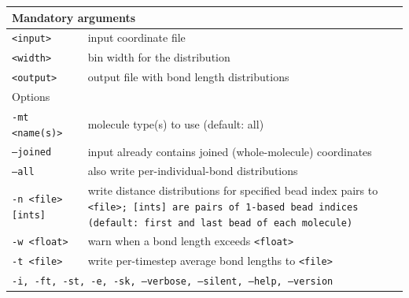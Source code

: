 \noindent
\begin{longtable}{p{}p{}}
  \toprule
  \multicolumn{2}{l}{Mandatory arguments} \\
  \midrule
  \tt{<input>}  & input coordinate file \\
  \tt{<width>}  & bin width for the distribution \\
  \tt{<output>} & output file with bond length distributions \\
  \toprule
  \multicolumn{2}{l}{Options} \\
  \midrule
  \tt{-mt <name(s)>}    & molecule type(s) to use (default: all) \\
  \tt{--joined}         & input already contains joined (whole-molecule)
                          coordinates \\
  \tt{--all}            & also write per-individual-bond distributions \\
  \tt{-n <file> [ints]} & write distance distributions for specified bead
                          index pairs to \tt{<file>}; \tt{[ints]} are pairs
                          of 1-based bead indices (default: first and last
                          bead of each molecule) \\
  \tt{-w <float>}       & warn when a bond length exceeds \tt{<float>} \\
  \tt{-t <file>}        & write per-timestep average bond lengths to
                          \tt{<file>} \\
  \midrule
  \multicolumn{2}{p{0.948\textwidth}}{\tt{-i}, \tt{-ft}, \tt{-st}, \tt{-e},
    \tt{-sk}, \tt{--verbose}, \tt{--silent}, \tt{--help}, \tt{--version}} \\
  \bottomrule
\end{longtable}

